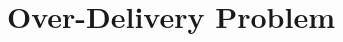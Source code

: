 \documentclass[../main.tex]{subfiles}
\begin{document}
	\chapter{Over-Delivery Problem}
	
	
	
	
\end{document}
